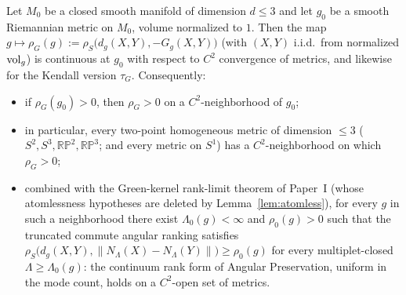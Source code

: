 \begin{theorem}\label{thm:open}
Let $M_0$ be a closed smooth manifold of dimension $d\le3$ and let $g_0$ be a smooth
Riemannian metric on $M_0$, volume normalized to $1$. Then the map
$g\mapsto\rho_G(g):=\rho_S\bigl(d_g(X,Y),-G_g(X,Y)\bigr)$ (with $(X,Y)$ i.i.d.\ from
normalized $\operatorname{vol}_g$) is continuous at $g_0$ with respect to $C^2$ convergence of
metrics, and likewise for the Kendall version $\tau_G$. Consequently:
\begin{itemize}
\item[(a)] if $\rho_G(g_0)>0$, then $\rho_G>0$ on a $C^2$-neighborhood of $g_0$;
\item[(b)] in particular, every two-point homogeneous metric of dimension $\le3$
($S^2,S^3,\mathbb{RP}^2,\mathbb{RP}^3$; and every metric on $S^1$) has a
$C^2$-neighborhood on which $\rho_G>0$;
\item[(c)] combined with the Green-kernel rank-limit theorem of Paper~I (whose
atomlessness hypotheses are deleted by Lemma~\ref{lem:atomless}), for every $g$ in
such a neighborhood there exist $\Lambda_0(g)<\infty$ and $\rho_0(g)>0$ such that the
truncated commute angular ranking satisfies
$\rho_S\bigl(d_g(X,Y),\lVert N_\Lambda(X)-N_\Lambda(Y)\rVert\bigr)\ge\rho_0(g)$ for
every multiplet-closed $\Lambda\ge\Lambda_0(g)$: the continuum rank form of Angular
Preservation, uniform in the mode count, holds on a $C^2$-open set of metrics.
\end{itemize}
\end{theorem}

